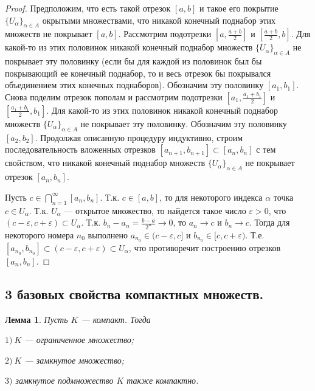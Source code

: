 \documentclass[12pt]{article}
\newtheorem{lemma}[theorem]{Лемма}
\theoremstyle{definition}
\begin{document}
\begin{proof}
Предположим, что есть такой отрезок $[a, b]$ и такое его покрытие $\{U_\alpha\}_{\alpha\in A}$
окрытыми множествами, что никакой конечный поднабор этих множеств не покрывает $[a, b]$.
Рассмотрим подотрезки $[a, \frac{a+b}{2}]$ и $[\frac{a+b}{2}, b]$.
Для какой-то из этих половинок никакой конечный поднабор множеств
$\{U_\alpha\}_{\alpha\in A}$ не покрывает эту половинку (если бы для каждой из половинок
был бы покрывающий ее конечный поднабор,
то и весь отрезок бы покрывался объединением этих конечных поднаборов).
Обозначим эту половинку $[a_1, b_1]$. Снова поделим отрезок пополам
и рассмотрим подотрезки $[a_1, \frac{a_1+b_1}{2}]$ и $[\frac{a_1+b_1}{2}, b_1]$.
Для какой-то из этих половинок никакой конечный поднабор множеств
$\{U_\alpha\}_{\alpha\in A}$ не покрывает эту половинку.
Обозначим эту половинку $[a_2, b_2]$.
Продолжая описанную процедуру индуктивно, строим последовательность вложенных отрезков
$[a_{n+1}, b_{n+1}]\subset [a_n, b_n]$ с тем свойством, что
никакой конечный поднабор множеств
$\{U_\alpha\}_{\alpha\in A}$ не покрывает отрезок $[a_n, b_n]$.

Пусть $c\in \bigcap_{n=1}^\infty[a_n, b_n]$. Т.к. $c\in [a, b]$, то для некоторого
индекса $\alpha$ точка $c\in U_\alpha$. Т.к. $U_\alpha$ --- открытое множество,
то найдется такое число $\varepsilon>0$, что $(c-\varepsilon, c+\varepsilon)\subset U_\alpha$.
Т.к. $b_n-a_n = \frac{b-a}{2^n}\to 0$, то $a_n\to c$ и $b_n\to c$.
Тогда для некоторого номера $n_0$ выполнено $a_{n_0}\in (c-\varepsilon, c]$
и $b_{n_0}\in [c, c+\varepsilon)$. Т.е.
$[a_{n_0}, b_{n_0}]\subset (c-\varepsilon, c+\varepsilon)\subset U_\alpha$,
что противоречит построению отрезков $[a_n, b_n]$.
\end{proof}

\subsection{3 базовых свойства компактных множеств.}

\begin{lemma} Пусть $K$ --- компакт. Тогда

$1)\ K$ --- ограниченное множество;

$2)\ K$ --- замкнутое множество;

$3)$ замкнутое подмножество $K$ также компактно.
\end{lemma}
\end{document}
